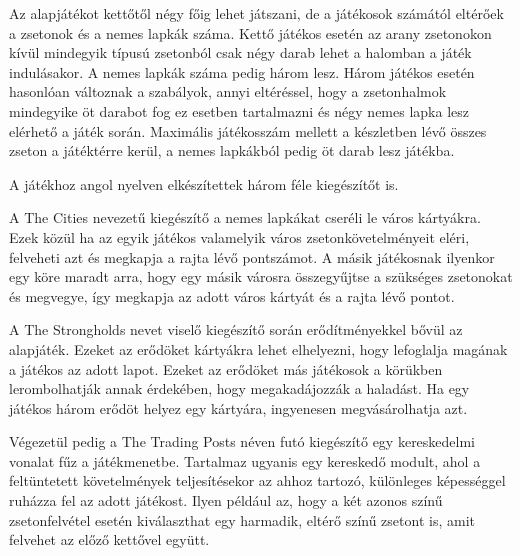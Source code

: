 
Az alapjátékot kettőtől négy főig lehet játszani, de a játékosok számától eltérőek a zsetonok és a nemes lapkák száma. Kettő játékos esetén az arany zsetonokon kívül mindegyik típusú zsetonból csak négy darab lehet a halomban a játék indulásakor. A nemes lapkák száma pedig három lesz. Három játékos esetén hasonlóan változnak a szabályok, annyi eltéréssel, hogy a zsetonhalmok mindegyike öt darabot fog ez esetben tartalmazni és négy nemes lapka lesz elérhető a játék során. Maximális játékosszám mellett a készletben lévő összes zseton a játéktérre kerül, a nemes lapkákból pedig öt darab lesz játékba.\par

A játékhoz angol nyelven elkészítettek három féle kiegészítőt is.\par 

A The Cities nevezetű kiegészítő a nemes lapkákat cseréli le város kártyákra. Ezek közül ha az egyik játékos valamelyik város zsetonkövetelményeit eléri, felveheti azt és megkapja a rajta lévő pontszámot. A másik játékosnak ilyenkor egy köre maradt arra, hogy egy másik városra összegyűjtse a szükséges zsetonokat és megvegye, így megkapja az adott város kártyát és a rajta lévő pontot.\par

A The Strongholds nevet viselő kiegészítő során erődítményekkel bővül az alapjáték. Ezeket az erődöket kártyákra lehet elhelyezni, hogy lefoglalja magának a játékos az adott lapot. Ezeket az erődöket más játékosok a körükben lerombolhatják annak érdekében, hogy megakadájozzák a haladást. Ha egy játékos három erődöt helyez egy kártyára, ingyenesen megvásárolhatja azt.\par

Végezetül pedig a  The Trading Posts néven futó kiegészítő egy kereskedelmi vonalat fűz a játékmenetbe. Tartalmaz ugyanis egy kereskedő modult, ahol a feltüntetett követelmények teljesítésekor az ahhoz tartozó, különleges képességgel ruházza fel az adott játékost. Ilyen például az, hogy a két azonos színű zsetonfelvétel esetén kiválaszthat egy harmadik, eltérő színű zsetont is, amit felvehet az előző kettővel együtt.\par

